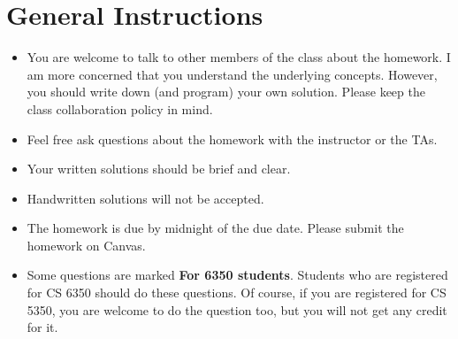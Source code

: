 \section*{General Instructions}

{\footnotesize
  \begin{itemize}
  \item You are welcome to talk to other members of the class about
    the homework. I am more concerned that you understand the
    underlying concepts. However, you should write down (and program)
    your own solution. Please keep the class collaboration policy in
    mind.

  \item Feel free ask questions about the homework with the instructor
    or the TAs.

  \item Your written solutions should be brief and clear.

  \item Handwritten solutions will not be accepted.

  \item The homework is due by midnight of the due date. Please submit
    the homework on Canvas.


  \item Some questions are marked {\bf For 6350 students}. Students
    who are registered for CS 6350 should do these questions. Of
    course, if you are registered for CS 5350, you are welcome to do
    the question too, but you will not get any credit for it.

  \end{itemize}
}

